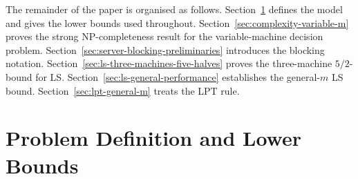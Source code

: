 \documentclass[11pt]{article}
\begin{document}
The remainder of the paper is organised as follows.
Section~\ref{sec:problem-lower-bounds} defines the model and gives the lower
bounds used throughout. Section~\ref{sec:complexity-variable-m} proves the
strong NP-completeness result for the variable-machine decision problem.
Section~\ref{sec:server-blocking-preliminaries} introduces the blocking
notation. Section~\ref{sec:ls-three-machines-five-halves} proves the
three-machine \(5/2\)-bound for LS. Section~\ref{sec:ls-general-performance}
establishes the general-\(m\) LS bound. Section~\ref{sec:lpt-general-m} treats
the LPT rule.

\section{Problem Definition and Lower Bounds}
\label{sec:problem-lower-bounds}
\end{document}
